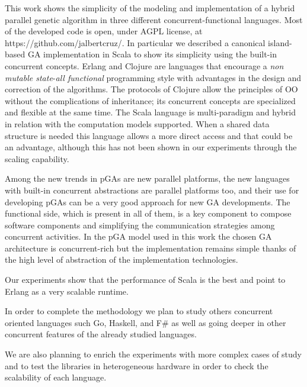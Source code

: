 \noindent This work shows the simplicity of the modeling and implementation of a hybrid parallel genetic algorithm in three different concurrent-functional languages. Most of the developed code is open, under AGPL license, at
https://github.com/jalbertcruz/. In particular we described a canonical island-based GA implementation in Scala to show its simplicity using the built-in concurrent concepts.
Erlang and Clojure are languages that encourage a \emph{non mutable state}-\emph{all functional} programming style with advantages in the design and correction of the algorithms. The protocols of Clojure allow the principles of OO without the complications of inheritance; its concurrent concepts  are specialized and flexible at the same time. The Scala language is multi-paradigm and hybrid in relation with the computation models supported. When a shared data structure is needed this language allows a more direct access and that could be an advantage, although this has not been shown in our experiments through the scaling capability.

Among the new trends in pGAs are new parallel platforms, the new languages with built-in concurrent abstractions are parallel platforms too, and their use for developing pGAs can be a very good approach for new GA developments. The functional side, which is present in all of them, is a key component to compose software components and simplifying the communication strategies among concurrent activities. In the pGA model used in this work the chosen GA architecture is concurrent-rich but the implementation remains simple thanks of the high level of abstraction of the implementation technologies.

Our experiments show that the performance of Scala is the best and point to Erlang as a very scalable runtime.

In order to complete the methodology we plan to study others concurrent oriented languages such Go, Haskell, and F\# as well as going deeper in other concurrent features of the already studied languages.

We are also planning to enrich the experiments with more complex cases of study and to test the libraries in heterogeneous hardware in order to check the scalability of each language.

